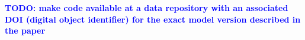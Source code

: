 \documentclass[gmd, manuscript]{copernicus}
\newcommand{\TODO}[1]{\textcolor{blue}{\textsf{\textbf{TODO: #1}}}}
\begin{document}

\TODO{make code available at a data repository with an associated DOI (digital object identifier) for the exact model version described in the paper}




\appendix
\section{}    %

\subsection{}     %


\noappendix       %




\appendixfigures  %

\appendixtables   %






\end{document}

